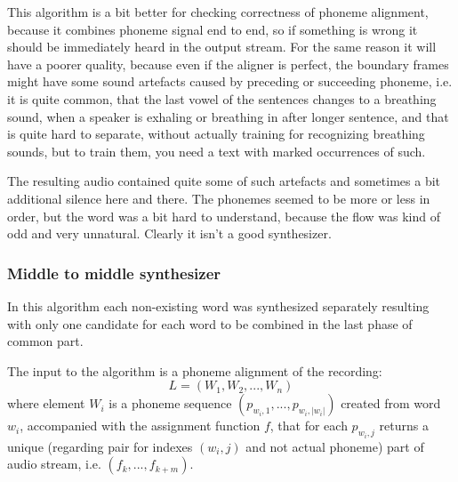 \documentclass[12pt,a4paper,english]{article}
\begin{document}
This algorithm is a bit better for checking correctness of phoneme alignment, because it combines phoneme signal end to end, so if something is wrong it should be immediately heard in the output stream. \newline
For the same reason it will have a poorer quality, because even if the aligner is perfect, the boundary frames might have some sound artefacts caused by preceding or succeeding phoneme, i.e. it is quite common, that the last vowel of the sentences changes to a breathing sound, when a speaker is exhaling or breathing in after longer sentence, and that is quite hard to separate, without actually training for recognizing breathing sounds, but to train them, you need a text with marked occurrences of such. \newline
\newline

The resulting audio contained quite some of such artefacts and sometimes a bit additional silence here and there. The phonemes seemed to be more or less in order, but the word was a bit hard to understand, because the flow was kind of odd and very unnatural. Clearly it isn't a good synthesizer.

\newpage
\subsubsection{Middle to middle synthesizer}

In this algorithm each non-existing word was synthesized separately resulting with only one candidate for each word to be combined in the last phase of common part. \newline

The input to the algorithm is a phoneme alignment of the recording:
\begin{equation}
    L = ( W_1, W_2, ..., W_n )
\end{equation}
 where element $W_i$ is a phoneme sequence $(p_{w_i, 1}, ..., p_{w_i, |w_i|})$ created from word $w_i$,
 accompanied with the assignment function $f$, that for each $p_{w_i, j}$ returns a unique (regarding pair for indexes $(w_i, j)$ and not actual phoneme) part of audio stream, i.e. $(f_k, ..., f_{k+m})$. \newline
\end{document}
